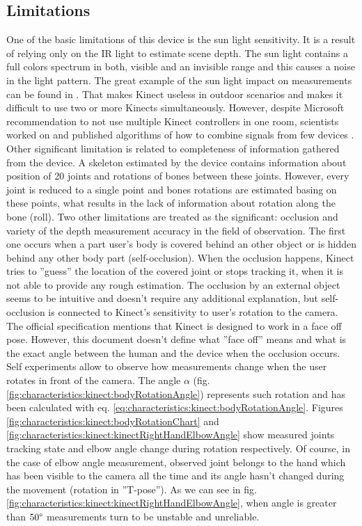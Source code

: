 \documentclass{llncs}
\begin{document}
\subsection{Limitations}
One of the basic limitations of this device is the sun light sensitivity. It is a result of relying only on the IR light  to estimate scene depth. The sun light contains a full colors spectrum in both, visible and an invisible range and this causes a noise in the light pattern. The great example of the sun light impact on measurements can be found in \cite{Suarez2012}. That makes Kinect useless in outdoor scenarios and makes it difficult to use two or more Kinects simultaneously. However, despite Microsoft recommendation to not use multiple Kinect controllers in one room, scientists worked on and published algorithms of how to combine signals from few devices \cite{Kitsikidis2011,Asteriadis2013,Schroder2011}.
Other significant limitation is related to completeness of information gathered from the device. A skeleton estimated by the device contains information about position of 20 joints and rotations of bones between these joints. However, every joint is reduced to a single point and bones rotations are estimated basing on these points, what results in the lack of information about rotation along the bone (roll).
Two other limitations are treated as the significant: occlusion and variety of the depth measurement accuracy in the field of observation. The first one occurs when a part user's body is covered behind an other object or is hidden behind any other body part (self-occlusion). When the occlusion happens, Kinect tries to ''guess'' the location of the covered joint or stops tracking it, when it is not able to provide any rough estimation. The occlusion by an external object seems to be intuitive and doesn't require any additional explanation, but self-occlusion is connected to Kinect's sensitivity to user's rotation to the camera. The official specification mentions that Kinect is designed to work in a face off pose. However, this document doesn't define what ''face off'' means and what is the exact angle between the human and the device when the occlusion occurs. Self experiments allow to observe how measurements change when the user rotates in front of the camera. The angle $\alpha$ (fig. \ref{fig:characteristics:kinect:bodyRotationAngle}) represents such rotation and has been calculated with eq. \eqref{eq:characteristics:kinect:bodyRotationAngle}. Figures \ref{fig:characteristics:kinect:bodyRotationChart} and \ref{fig:characteristics:kinect:kinectRightHandElbowAngle} show measured joints tracking state and elbow angle change during rotation respectively. Of course, in the case of elbow angle measurement, observed joint belongs to the hand which has been visible to the camera all the time and its angle hasn't changed during the movement (rotation in ''T-pose''). As we can see in fig. \ref{fig:characteristics:kinect:kinectRightHandElbowAngle}, when angle is greater than $50 \degree$ measurements turn to be unstable and unreliable.\\
\end{document}
